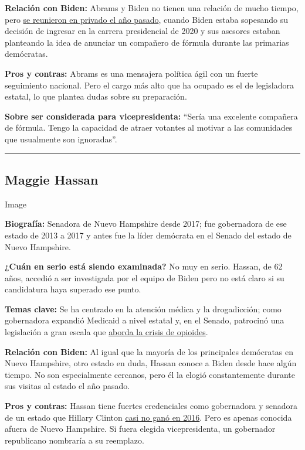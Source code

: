 \textbf{Relación con Biden:} Abrams y Biden no tienen una relación de
mucho tiempo, pero
\href{https://www.nytimes.com/2019/03/21/us/politics/joe-biden-2020-election.html}{se
reunieron en privado el año pasado}, cuando Biden estaba sopesando su
decisión de ingresar en la carrera presidencial de 2020 y sus asesores
estaban planteando la idea de anunciar un compañero de fórmula durante
las primarias demócratas.

\textbf{Pros y contras:} Abrams es una mensajera política ágil con un
fuerte seguimiento nacional. Pero el cargo más alto que ha ocupado es el
de legisladora estatal, lo que plantea dudas sobre su preparación.

\textbf{Sobre ser considerada para vicepresidenta:} ``Sería una
excelente compañera de fórmula. Tengo la capacidad de atraer votantes al
motivar a las comunidades que usualmente son ignoradas''.

\begin{center}\rule{0.5\linewidth}{\linethickness}\end{center}

\hypertarget{maggie-hassan}{%
\subsection{Maggie Hassan}\label{maggie-hassan}}

Image

\textbf{Biografía:} Senadora de Nuevo Hampshire desde 2017; fue
gobernadora de ese estado de 2013 a 2017 y antes fue la líder demócrata
en el Senado del estado de Nuevo Hampshire.

\textbf{¿Cuán en serio está siendo examinada?} No muy en serio. Hassan,
de 62 años, accedió a ser investigada por el equipo de Biden pero no
está claro si su candidatura haya superado ese punto.

\textbf{Temas clave:} Se ha centrado en la atención médica y la
drogadicción; como gobernadora expandió Medicaid a nivel estatal y, en
el Senado, patrocinó una legislación a gran escala que
\href{https://www.nytimes.com/2018/03/19/us/politics/trump-new-hampshire-opioid-plan.html}{aborda
la crisis de opioides}.

\textbf{Relación con Biden:} Al igual que la mayoría de los principales
demócratas en Nuevo Hampshire, otro estado en duda, Hassan conoce a
Biden desde hace algún tiempo. No son especialmente cercanos, pero él la
elogió constantemente durante sus visitas al estado el año pasado.

\textbf{Pros y contras:} Hassan tiene fuertes credenciales como
gobernadora y senadora de un estado que Hillary Clinton
\href{https://www.nytimes.com/2016/11/09/us/politics/new-hampshire-senate-hassan-ayotte.html}{casi
no ganó en 2016}. Pero es apenas conocida afuera de Nuevo Hampshire. Si
fuera elegida vicepresidenta, un gobernador republicano nombraría a su
reemplazo.

